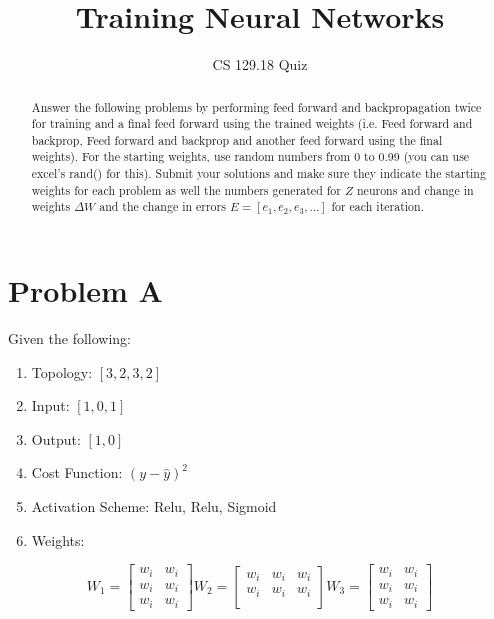 \documentclass[a4paper]{article}
\title{Training Neural Networks}
\author{CS 129.18 Quiz}
\begin{document}
\maketitle

\begin{abstract}
Answer the following problems by performing feed forward and backpropagation twice for training and a final feed forward using the trained weights (i.e. Feed forward and backprop, Feed forward and backprop and another feed forward using the final weights). For the starting weights, use random numbers from 0 to 0.99 (you can use excel's rand() for this). Submit your solutions and make sure they indicate the starting weights for each problem as well the numbers generated for $Z$ neurons and change in weights $\Delta{W}$ and the change in errors $E = [e_1, e_2, e_3, ...]$ for each iteration.
\end{abstract}

\section{Problem A}

Given the following:

\begin{enumerate}
\item Topology: $[3, 2, 3, 2]$
\item Input: $[1, 0, 1]$
\item Output: $[1, 0]$
\item Cost Function: $(y - \widehat{y})^2$
\item Activation Scheme: Relu, Relu, Sigmoid
\item Weights:
\end{enumerate}


\begin{equation}
  W_{1}=\begin{bmatrix}
    w_{i} &   w_{i} \\
    w_{i} &   w_{i} \\
    w_{i} &   w_{i}
  \end{bmatrix}
  W_{2}=\begin{bmatrix}
    w_{i} &   w_{i} & w_{i}\\
    w_{i} &   w_{i} & w_{i}\\
  \end{bmatrix}
  W_{3}=\begin{bmatrix}
    w_{i} &   w_{i} \\
    w_{i} &   w_{i} \\
    w_{i} &   w_{i}
  \end{bmatrix}
\end{equation}
\end{document}
